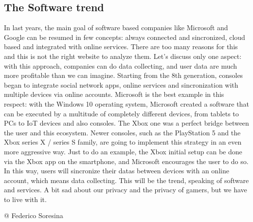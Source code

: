 \documentclass[a4paper,10pt]{book}
\begin{document}
 \subsection{ The Software trend  }
  In last years, the main goal of software based companies like Microsoft and Google can be resumed in few concepts: always connected and sincronized, cloud based and integrated with online services. There are too many reasons for this and this is not the right website to analyze them. Let's discuss only one aspect: with this approach, companies can do data collecting, and user data  are much more profitable than we can imagine.  
  Starting from the 8th generation, consoles began to integrate social network apps, online services and sincronization with multiple devices via online accounts. Microsoft is the best example in this respect: with the Windows 10 operating system, Microsoft created a software that can be executed by a multitude of completely different devices, from tablets to PCs to IoT devices and also consoles. The Xbox one was a perfect bridge between the user and this ecosystem.  
  Newer consoles, such as the PlayStation 5 and the Xbox series X / series S family, are going to implement this strategy in an even more aggressive way. Just to do an example, the Xbox initial setup can be done via the Xbox app on the smartphone, and Microsoft encourages the user to do so. In this way, users will sincronize their datas between devices with an online account, which means data collecting.  
  This will be the trend, speaking of software and services. A bit sad about our privacy and the privacy of gamers, but we have to live with it.  
 
 @ Federico Soresina 
 
 \newpage
\end{document}
